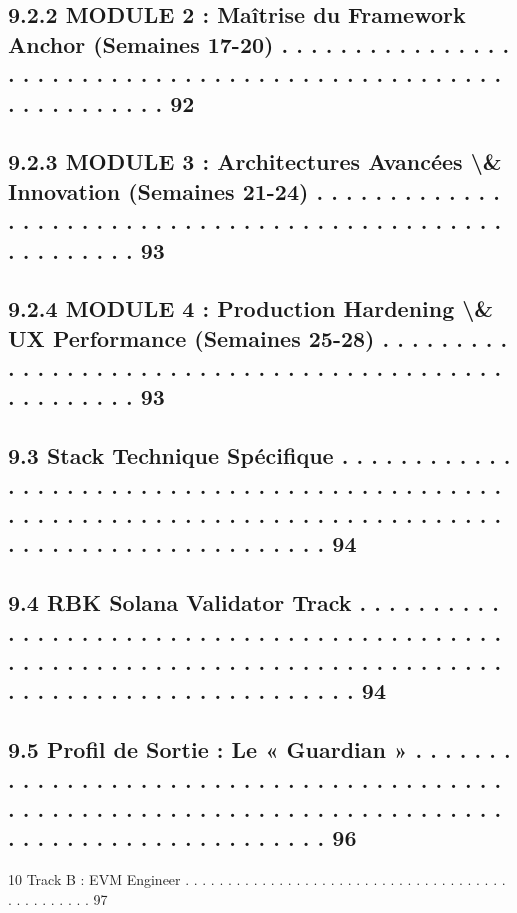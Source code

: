\subsection{9.2.2               MODULE 2 : Maîtrise du Framework Anchor (Semaines 17-20) . . . . . . . . . . . . . . . . . . . . . . . . . . . . . . . . . . . . . . . . . . . . . . . . . . . . . . . . . . . . . 92}
\subsection{9.2.3               MODULE 3 : Architectures Avancées \textbackslash{}& Innovation (Semaines 21-24) . . . . . . . . . . . . . . . . . . . . . . . . . . . . . . . . . . . . . . . . . . . . . . . . . . . . . . . . 93}
\subsection{9.2.4               MODULE 4 : Production Hardening \textbackslash{}& UX Performance (Semaines 25-28) . . . . . . . . . . . . . . . . . . . . . . . . . . . . . . . . . . . . . . . . . . . . . . . . . . . . 93}
\subsection{9.3     Stack Technique Spécifique . . . . . . . . . . . . . . . . . . . . . . . . . . . . . . . . . . . . . . . . . . . . . . . . . . . . . . . . . . . . . . . . . . . . . . . . . . . . . . . . . . . . . . . . . . . . . . . . . . . . . . 94}
\subsection{9.4     RBK Solana Validator Track . . . . . . . . . . . . . . . . . . . . . . . . . . . . . . . . . . . . . . . . . . . . . . . . . . . . . . . . . . . . . . . . . . . . . . . . . . . . . . . . . . . . . . . . . . . . . . . . . . . . . . 94}
\subsection{9.5     Profil de Sortie : Le « Guardian » . . . . . . . . . . . . . . . . . . . . . . . . . . . . . . . . . . . . . . . . . . . . . . . . . . . . . . . . . . . . . . . . . . . . . . . . . . . . . . . . . . . . . . . . . . . . . . . . . 96}
\vspace{0.5em}
10    Track B : EVM Engineer . . . . . . . . . . . . . . . . . . . . . . . . . . . . . . . . . . . . . . . . . . . . . . . . 97\\
